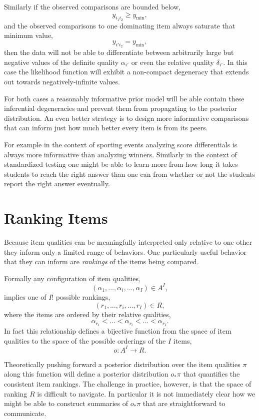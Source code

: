 \documentclass[
  letterpaper,
  DIV=11,
  numbers=noendperiod]{scrartcl}
\begin{document}
Similarly if the observed comparisons are bounded below, \[
y_{i_{1} i_{2}} \ge y_{\min},
\] and the observed comparisons to one dominating item always saturate
that minimum value, \[
y_{i' i_{2}} = y_{\min},
\] then the data will not be able to differentiate between arbitrarily
large but negative values of the definite quality \(\alpha_{i'}\) or
even the relative quality \(\delta_{i'}\). In this case the likelihood
function will exhibit a non-compact degeneracy that extends out towards
negatively-infinite values.

For both cases a reasonably informative prior model will be able contain
these inferential degeneracies and prevent them from propagating to the
posterior distribution. An even better strategy is to design more
informative comparisons that can inform just how much better every item
is from its peers.

For example in the context of sporting events analyzing score
differentials is always more informative than analyzing winners.
Similarly in the context of standardized testing one might be able to
learn more from how long it takes students to reach the right answer
than one can from whether or not the students report the right answer
eventually.

\section{Ranking Items}\label{ranking-items}

Because item qualities can be meaningfully interpreted only relative to
one other they inform only a limited range of behaviors. One
particularly useful behavior that they can inform are \emph{rankings} of
the items being compared.

Formally any configuration of item qualities, \[
( \alpha_{1}, \ldots, \alpha_{i}, \ldots, \alpha_{I} ) \in A^{I},
\] implies one of \(I!\) possible rankings, \[
(r_{1}, \ldots, r_{i}, \ldots, r_{I}) \in R,
\] where the items are ordered by their relative qualities, \[
\alpha_{r_{1}} < \ldots <
\alpha_{r_{i}} < \ldots <
\alpha_{r_{I}}.
\] In fact this relationship defines a bijective function from the space
of item qualities to the space of the possible orderings of the \(I\)
items, \[
o : A^{I} \rightarrow R.
\]

Theoretically pushing forward a posterior distribution over the item
qualities \(\pi\) along this function will define a posterior
distribution \(o_{*} \pi\) that quantifies the consistent item rankings.
The challenge in practice, however, is that the space of ranking \(R\)
is difficult to navigate. In particular it is not immediately clear how
we might be able to construct summaries of \(o_{*} \pi\) that are
straightforward to communicate.
\end{document}
